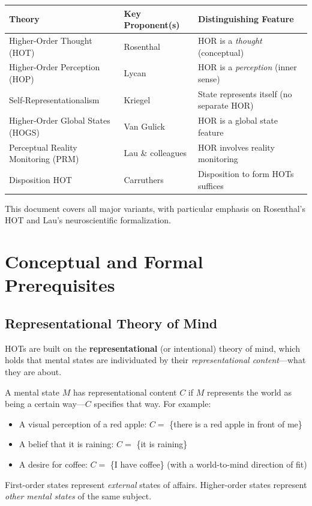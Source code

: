 \documentclass[11pt,a4paper]{report}
\begin{document}
\begin{center}
\renewcommand{\arraystretch}{1.4}
\begin{tabular}{>{\raggedright}p{3.8cm} >{\raggedright}p{4cm} >{\raggedright\arraybackslash}p{5cm}}
  \toprule
  \textbf{Theory} & \textbf{Key Proponent(s)} & \textbf{Distinguishing Feature} \\
  \midrule
  Higher-Order Thought (HOT) & Rosenthal & HOR is a \emph{thought} (conceptual) \\
  Higher-Order Perception (HOP) & Lycan & HOR is a \emph{perception} (inner sense) \\
  Self-Representationalism & Kriegel & State represents itself (no separate HOR) \\
  Higher-Order Global States (HOGS) & Van Gulick & HOR is a global state feature \\
  Perceptual Reality Monitoring (PRM) & Lau \& colleagues & HOR involves reality monitoring \\
  Disposition HOT & Carruthers & Disposition to form HOTs suffices \\
  \bottomrule
\end{tabular}
\end{center}

This document covers all major variants, with particular emphasis on Rosenthal's HOT and Lau's neuroscientific formalization.


\chapter{Conceptual and Formal Prerequisites}

\section{Representational Theory of Mind}

HOTs are built on the \textbf{representational} (or intentional) theory of mind, which holds that mental states are individuated by their \emph{representational content}---what they are about.

\begin{definitionbox}
A mental state $M$ has representational content $C$ if $M$ represents the world as being a certain way---$C$ specifies that way. For example:
\begin{itemize}[leftmargin=1.5em]
  \item A visual perception of a red apple: $C = $ \{there is a red apple in front of me\}
  \item A belief that it is raining: $C = $ \{it is raining\}
  \item A desire for coffee: $C = $ \{I have coffee\} (with a world-to-mind direction of fit)
\end{itemize}
First-order states represent \emph{external} states of affairs. Higher-order states represent \emph{other mental states} of the same subject.
\end{definitionbox}
\end{document}
